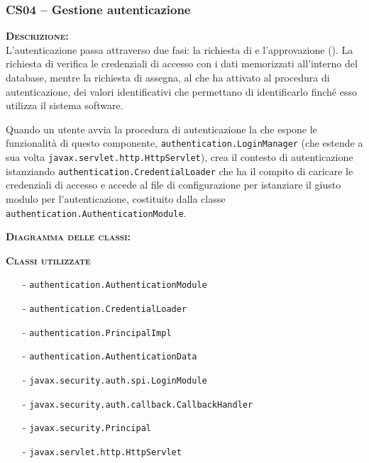 \subsubsection{CS04 -- Gestione autenticazione}\label{sec:cs04}
\begin{description}
  \item{\scshape\bfseries Descrizione:}\\
L'autenticazione passa attraverso due fasi: la richiesta di  e l'approvazione (). La richiesta di  verifica le credenziali di accesso con i dati memorizzati all'interno del database, mentre la richiesta di  assegna, al  che ha attivato al procedura di autenticazione, dei valori identificativi che permettano di identificarlo finché esso utilizza il sistema software.

Quando un utente avvia la procedura di autenticazione la  che espone le funzionalità di questo componente, \texttt{authentication.LoginManager} (che estende a sua volta \texttt{javax.servlet.http.HttpServlet}), crea il contesto di autenticazione istanziando
\texttt{authentication.CredentialLoader} che ha il compito di caricare le credenziali di accesso e accede al file di configurazione per istanziare il giusto modulo per l'autenticazione, costituito dalla classe \texttt{authentication.AuthenticationModule}.
  
  \item{\scshape\bfseries Diagramma delle classi:}
  
  \item{\scshape\bfseries Classi utilizzate}
  \begin{itemize}
    	\item[-] \texttt{authentication.AuthenticationModule}
	  	\item[-] \texttt{authentication.CredentialLoader}
	   	\item[-] \texttt{authentication.PrincipalImpl}
	  	\item[-] \texttt{authentication.AuthenticationData}
	  	\item[-] \texttt{javax.security.auth.spi.LoginModule}
	  	\item[-] \texttt{javax.security.auth.callback.CallbackHandler}
	  	\item[-] \texttt{javax.security.Principal}
	  	\item[-] \texttt{javax.servlet.http.HttpServlet}
  \end{itemize}

\end{description}

